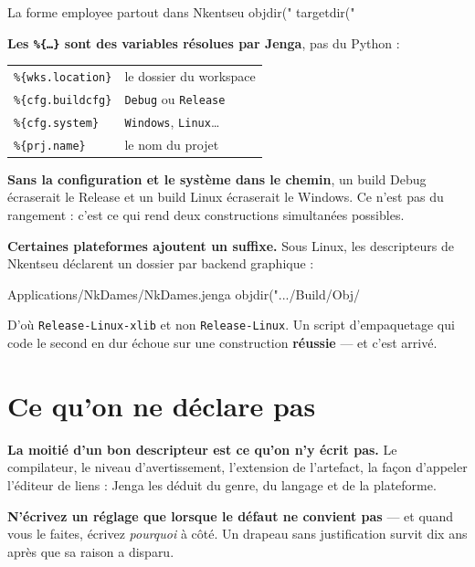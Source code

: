 \begin{nkcode}{La forme employee partout dans Nkentseu}
objdir("%
targetdir("%
\end{nkcode}

\begin{nkretenir}
\textbf{Les \texttt{\%\{\dots\}} sont des variables résolues par Jenga}, pas du
Python :

\begin{center}
\begin{tabular}{@{}ll@{}}
\toprule
\texttt{\%\{wks.location\}} & le dossier du workspace \\
\texttt{\%\{cfg.buildcfg\}} & \texttt{Debug} ou \texttt{Release} \\
\texttt{\%\{cfg.system\}} & \texttt{Windows}, \texttt{Linux}\dots \\
\texttt{\%\{prj.name\}} & le nom du projet \\
\bottomrule
\end{tabular}
\end{center}

\textbf{Sans la configuration et le système dans le chemin}, un build Debug
écraserait le Release et un build Linux écraserait le Windows. Ce n'est pas du
rangement : c'est ce qui rend deux constructions simultanées possibles.
\end{nkretenir}

\begin{nkpiege}
\textbf{Certaines plateformes ajoutent un suffixe.} Sous Linux, les descripteurs
de Nkentseu déclarent un dossier par backend graphique :

\begin{nkcode}{Applications/NkDames/NkDames.jenga}
objdir(".../Build/Obj/%
\end{nkcode}

D'où \texttt{Release-Linux-xlib} et non \texttt{Release-Linux}. Un script
d'empaquetage qui code le second en dur échoue sur une construction
\textbf{réussie} --- et c'est arrivé.
\end{nkpiege}

\section{Ce qu'on ne déclare pas}

\begin{nkretenir}
\textbf{La moitié d'un bon descripteur est ce qu'on n'y écrit pas.} Le
compilateur, le niveau d'avertissement, l'extension de l'artefact, la façon
d'appeler l'éditeur de liens : Jenga les déduit du genre, du langage et de la
plateforme.

\textbf{N'écrivez un réglage que lorsque le défaut ne convient pas} --- et quand
vous le faites, écrivez \emph{pourquoi} à côté. Un drapeau sans justification
survit dix ans après que sa raison a disparu.
\end{nkretenir}

